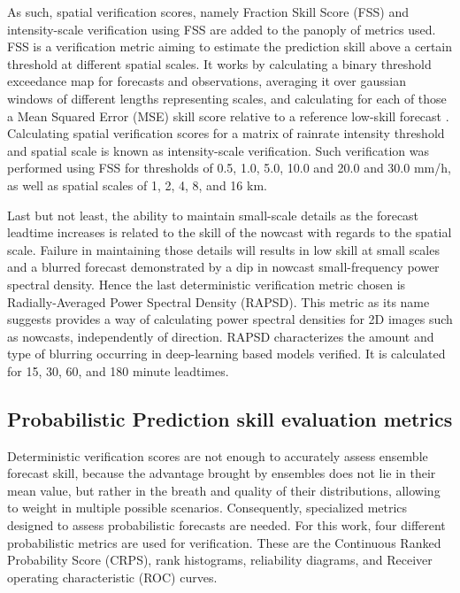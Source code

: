 
As such, spatial verification scores, namely Fraction Skill Score (FSS) and intensity-scale verification using FSS are added to the panoply of metrics used. FSS is a verification metric aiming to estimate the prediction skill above a certain threshold at different spatial scales. It works by calculating a binary threshold exceedance map for forecasts and observations, averaging it over gaussian windows of different lengths representing scales, and calculating for each of those a Mean Squared Error (MSE) skill score relative to a reference low-skill forecast \cite{roberts_scale-selective_2008}. Calculating spatial verification scores for a matrix of rainrate intensity threshold and spatial scale is known as intensity-scale verification. Such verification was performed using FSS for thresholds of 0.5, 1.0, 5.0, 10.0 and 20.0 and 30.0 mm/h, as well as spatial scales of 1, 2, 4, 8, and 16 km. 

Last but not least, the ability to maintain small-scale details as the forecast leadtime increases is related to the skill of the nowcast with regards to the spatial scale. Failure in maintaining those details will results in low skill at small scales and a blurred forecast demonstrated by a dip in nowcast small-frequency power spectral density. Hence the last deterministic verification metric chosen is Radially-Averaged Power Spectral Density (RAPSD). This metric as its name suggests provides a way of calculating power spectral densities for 2D images such as nowcasts, independently of direction. RAPSD characterizes the amount and type of blurring occurring in deep-learning based models verified. It is calculated for 15, 30, 60, and 180 minute leadtimes.
 


\subsection{Probabilistic Prediction skill evaluation metrics}

Deterministic verification scores are not enough to accurately assess ensemble forecast skill, because the advantage brought by ensembles does not lie in their mean value, but rather in the breath and quality of their distributions, allowing to weight in multiple possible scenarios. Consequently, specialized metrics designed to assess probabilistic forecasts are needed. 
For this work, four different probabilistic metrics are used for verification. These are the Continuous Ranked Probability Score (CRPS), rank histograms, reliability diagrams, and Receiver operating characteristic (ROC) curves. 

